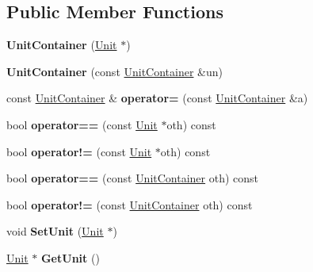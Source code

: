 \subsection*{Public Member Functions}
\begin{DoxyCompactItemize}
\item 
{\bfseries Unit\+Container} (\hyperlink{classUnit}{Unit} $\ast$)\hypertarget{classUnitContainer_a84efe6541f3af9186ae49f13bdad27a5}{}\label{classUnitContainer_a84efe6541f3af9186ae49f13bdad27a5}

\item 
{\bfseries Unit\+Container} (const \hyperlink{classUnitContainer}{Unit\+Container} \&un)\hypertarget{classUnitContainer_ab319f3012e95ab5313a7077e88ea1072}{}\label{classUnitContainer_ab319f3012e95ab5313a7077e88ea1072}

\item 
const \hyperlink{classUnitContainer}{Unit\+Container} \& {\bfseries operator=} (const \hyperlink{classUnitContainer}{Unit\+Container} \&a)\hypertarget{classUnitContainer_a1f148b9f809c60b0bdcc384c8df64dee}{}\label{classUnitContainer_a1f148b9f809c60b0bdcc384c8df64dee}

\item 
bool {\bfseries operator==} (const \hyperlink{classUnit}{Unit} $\ast$oth) const \hypertarget{classUnitContainer_a2ade4ba28ae2a420f760cb1d0753aec8}{}\label{classUnitContainer_a2ade4ba28ae2a420f760cb1d0753aec8}

\item 
bool {\bfseries operator!=} (const \hyperlink{classUnit}{Unit} $\ast$oth) const \hypertarget{classUnitContainer_a93b023dc8df1fc7f549b90a80298afea}{}\label{classUnitContainer_a93b023dc8df1fc7f549b90a80298afea}

\item 
bool {\bfseries operator==} (const \hyperlink{classUnitContainer}{Unit\+Container} oth) const \hypertarget{classUnitContainer_aac5014c060be779b6eae542b6e5beb24}{}\label{classUnitContainer_aac5014c060be779b6eae542b6e5beb24}

\item 
bool {\bfseries operator!=} (const \hyperlink{classUnitContainer}{Unit\+Container} oth) const \hypertarget{classUnitContainer_a4a98cf9f931938df81884ff9fea7241f}{}\label{classUnitContainer_a4a98cf9f931938df81884ff9fea7241f}

\item 
void {\bfseries Set\+Unit} (\hyperlink{classUnit}{Unit} $\ast$)\hypertarget{classUnitContainer_aefe2016f34c569d7c3110398f4016d7e}{}\label{classUnitContainer_aefe2016f34c569d7c3110398f4016d7e}

\item 
\hyperlink{classUnit}{Unit} $\ast$ {\bfseries Get\+Unit} ()\hypertarget{classUnitContainer_aa8a63078d3f070cb0fecfa0a655b0f75}{}\label{classUnitContainer_aa8a63078d3f070cb0fecfa0a655b0f75}

\end{DoxyCompactItemize}
